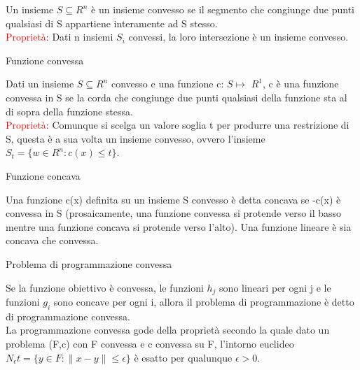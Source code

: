 \documentclass[answers, a4paper, 11pt]{exam}
\begin{document}
\begin{questions}
\begin{solution}
Un insieme $S \subseteq R^{n}$ è un insieme convesso se il segmento che congiunge due punti qualsiasi di S appartiene interamente ad S stesso.\\
\textcolor{red}{Proprietà}: Dati n insiemi $S_{i}$ convessi, la loro intersezione è un insieme convesso.
\end{solution}
\question Funzione convessa
\begin{solution}
Dati un insieme $S \subseteq R^{n}$ convesso e una funzione c: $S \mapsto$ $R^{1}$, c è una funzione convessa in S se la corda che congiunge due punti qualsiasi della funzione sta al di sopra della funzione stessa.\\
\textcolor{red}{Proprietà}: Comunque si scelga un valore soglia t per produrre una restrizione di S, questa è a sua volta un insieme convesso, ovvero l'insieme $S_{t} = \{w \in R^{n} : c(x) \le t\}$.
\end{solution}
\question Funzione concava
\begin{solution}
Una funzione c(x) definita su un insieme S convesso è detta concava se -c(x) è convessa in S (prosaicamente, una funzione convessa si protende verso il basso mentre una funzione concava si protende verso l'alto). Una funzione lineare è sia concava che convessa.
\end{solution}
\question Problema di programmazione convessa
\begin{solution}
Se la funzione obiettivo è convessa, le funzioni $h_{j}$ sono lineari per ogni j e le funzioni $g_{i}$ sono concave per ogni i, allora il problema di programmazione è detto di programmazione convessa.\\
La programmazione convessa gode della proprietà secondo la quale dato un problema (F,c) con F convessa e c convessa su F, l'intorno euclideo $N_{\epsilon}t = \{y \in F : \rVert x-y \rVert \le \epsilon\}$ è esatto per qualunque $\epsilon >0$.
\end{solution}
\end{questions}
\end{document}
